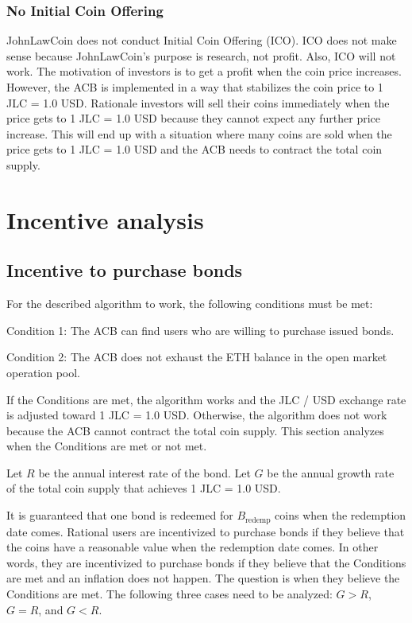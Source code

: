 \documentclass[dvipdfmx,a4paper]{article}
\begin{document}
\subsubsection{No Initial Coin Offering}

JohnLawCoin does not conduct Initial Coin Offering (ICO). ICO does not make sense because JohnLawCoin's purpose is research, not profit. Also, ICO will not work. The motivation of investors is to get a profit when the coin price increases. However, the ACB is implemented in a way that stabilizes the coin price to 1 JLC = 1.0 USD. Rationale investors will sell their coins immediately when the price gets to 1 JLC = 1.0 USD because they cannot expect any further price increase. This will end up with a situation where many coins are sold when the price gets to 1 JLC = 1.0 USD and the ACB needs to contract the total coin supply.

\section{Incentive analysis}

\subsection{Incentive to purchase bonds}

For the described algorithm to work, the following conditions must be met:

\begin{description}
\item{Condition 1}: The ACB can find users who are willing to purchase issued bonds.
\item{Condition 2}: The ACB does not exhaust the ETH balance in the open market operation pool.
\end{description}

If the Conditions are met, the algorithm works and the JLC / USD exchange rate is adjusted toward 1 JLC = 1.0 USD. Otherwise, the algorithm does not work because the ACB cannot contract the total coin supply. This section analyzes when the Conditions are met or not met.

Let $R$ be the annual interest rate of the bond. Let $G$ be the annual growth rate of the total coin supply that achieves 1 JLC = 1.0 USD.

It is guaranteed that one bond is redeemed for $B_{\mathrm{redemp}}$ coins when the redemption date comes. Rational users are incentivized to purchase bonds if they believe that the coins have a reasonable value when the redemption date comes. In other words, they are incentivized to purchase bonds if they believe that the Conditions are met and an inflation does not happen. The question is when they believe the Conditions are met. The following three cases need to be analyzed: $G>R$, $G=R$, and $G<R$.
\end{document}
